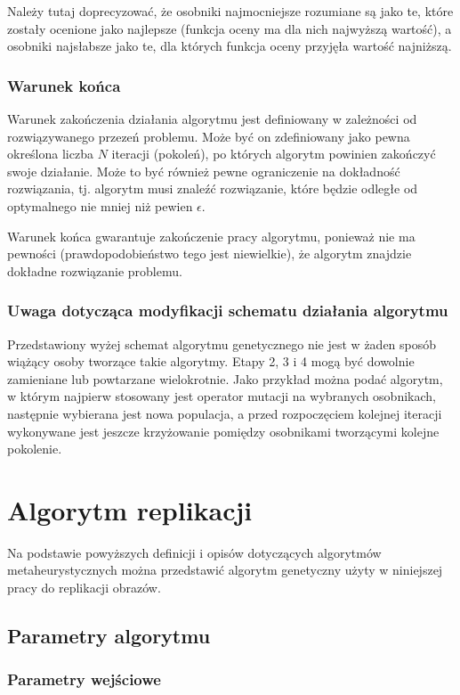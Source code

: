 Należy tutaj doprecyzować, że osobniki najmocniejsze rozumiane są jako te, które zostały ocenione jako najlepsze (funkcja oceny ma dla nich najwyższą wartość), a osobniki najsłabsze jako te, dla których funkcja oceny przyjęła wartość najniższą. 

\subsubsection{Warunek końca}
Warunek zakończenia działania algorytmu jest definiowany w zależności od rozwiązywanego przezeń problemu. Może być on zdefiniowany jako pewna określona liczba $N$ iteracji (pokoleń), po których algorytm powinien zakończyć swoje działanie. Może to być również pewne ograniczenie na dokładność rozwiązania, tj. algorytm musi znaleźć rozwiązanie, które będzie odległe od optymalnego nie mniej niż pewien $\epsilon$.

Warunek końca gwarantuje zakończenie pracy algorytmu, ponieważ nie ma pewności (prawdopodobieństwo tego jest niewielkie), że algorytm znajdzie dokładne rozwiązanie problemu.

\subsubsection{Uwaga dotycząca modyfikacji schematu działania algorytmu}
Przedstawiony wyżej schemat algorytmu genetycznego nie jest w żaden sposób wiążący osoby tworzące takie algorytmy. Etapy 2, 3 i 4 mogą być dowolnie zamieniane lub powtarzane wielokrotnie. Jako przykład można podać algorytm, w którym najpierw stosowany jest operator mutacji na wybranych osobnikach, następnie wybierana jest nowa populacja, a przed rozpoczęciem kolejnej iteracji wykonywane jest jeszcze krzyżowanie pomiędzy osobnikami tworzącymi kolejne pokolenie.

\section{Algorytm replikacji}
Na podstawie powyższych definicji i opisów dotyczących algorytmów metaheurystycznych można przedstawić algorytm genetyczny użyty w niniejszej pracy do replikacji obrazów.

\subsection{Parametry algorytmu}

\subsubsection{Parametry wejściowe}


